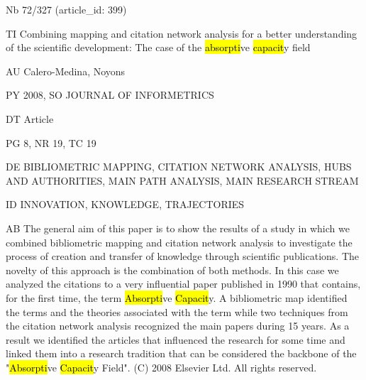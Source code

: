 \documentclass[a4paper]{article}
\begin{document}
\vspace*{-2cm}
Nb \tabto{0cm}72/327 (article\_id: 399)\par
TI \tabto{0cm}Combining mapping and citation network analysis for a better understanding of the scientific development: The case of the \hl{absorpti}ve \hl{capacit}y field\par
AU \tabto{0cm}Calero-Medina, Noyons\par
PY \tabto{0cm}2008, SO JOURNAL OF INFORMETRICS\par
DT \tabto{0cm}Article\par
PG \tabto{0cm}8, NR 19, TC 19\par
DE \tabto{0cm}BIBLIOMETRIC MAPPING, CITATION NETWORK ANALYSIS, HUBS AND AUTHORITIES, MAIN PATH ANALYSIS, MAIN RESEARCH STREAM\par
ID \tabto{0cm}INNOVATION, KNOWLEDGE, TRAJECTORIES\par
AB \tabto{0cm}The general aim of this paper is to show the results of a study in which we combined bibliometric mapping and citation network analysis to investigate the process of creation and transfer of knowledge through scientific publications. The novelty of this approach is the combination of both methods. In this case we analyzed the citations to a very influential paper published in 1990 that contains, for the first time, the term \hl{Absorpti}ve \hl{Capacit}y. A bibliometric map identified the terms and the theories associated with the term while two techniques from the citation network analysis recognized the main papers during 15 years. As a result we identified the articles that influenced the research for some time and linked them into a research tradition that can be considered the backbone of the "\hl{Absorpti}ve \hl{Capacit}y Field". (C) 2008 Elsevier Ltd. All rights reserved.\par
\clearpage
\end{document}
